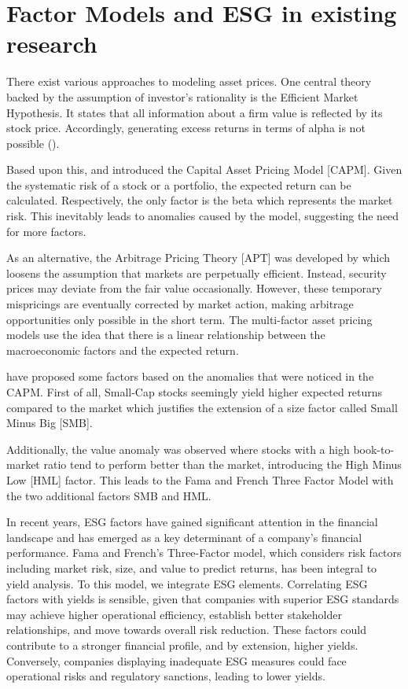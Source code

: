 \documentclass[12pt, a4paper]{article}%
\begin{document}
%
%												   
\section{Factor Models and ESG in existing research}
There exist various approaches to modeling asset prices. One central theory backed by the assumption of investor's rationality is the Efficient Market Hypothesis. It states that all information about a firm value is reflected by its stock price. Accordingly, generating excess returns in terms of alpha is not possible (\textcite{Fama1970}). 

Based upon this, \textcite{Sharpe1964} and \textcite{Lintner1965} introduced the Capital Asset Pricing Model [CAPM]. Given the systematic risk of a stock or a portfolio, the expected return can be calculated. Respectively, the only factor is the beta which represents the market risk. This inevitably leads to anomalies caused by the model, suggesting the need for more factors.

As an alternative, the Arbitrage Pricing Theory [APT] was developed by \textcite{Ross1976} which loosens the assumption that markets are perpetually efficient. Instead, security prices may deviate from the fair value occasionally. However, these temporary mispricings are eventually corrected by market action, making arbitrage opportunities only possible in the short term.
The multi-factor asset pricing models use the idea that there is a linear relationship between the macroeconomic factors and the expected return.

\textcite{FamaFrench1992} have proposed some factors based on the anomalies that were noticed in the CAPM.
First of all, Small-Cap stocks seemingly yield higher expected returns compared to the market which justifies the extension of a size factor called Small Minus Big [SMB].

Additionally, the value anomaly was observed where stocks with a high book-to-market ratio tend to perform better than the market, introducing the High Minus Low [HML] factor.
This leads to the Fama and French Three Factor Model with the two additional factors SMB and HML.

In recent years, ESG factors have gained significant attention in the financial landscape and has emerged as a key determinant of a company’s financial performance. Fama and French's Three-Factor model, which considers risk factors including market risk, size, and value to predict returns, has been integral to yield analysis. To this model, we integrate ESG elements.
Correlating ESG factors with yields is sensible, given that companies with superior ESG standards may achieve higher operational efficiency, establish better stakeholder relationships, and move towards overall risk reduction. These factors could contribute to a stronger financial profile, and by extension, higher yields. Conversely, companies displaying inadequate ESG measures could face operational risks and regulatory sanctions, leading to lower yields.
\end{document}
